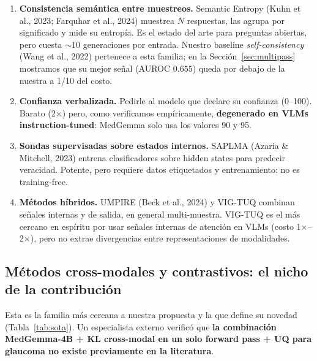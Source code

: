 \documentclass[12pt,a4paper]{article}
\begin{document}
\begin{enumerate}[leftmargin=1.6em]
    \item \textbf{Consistencia semántica entre muestreos.} Semantic
    Entropy (Kuhn et al., 2023; Farquhar et al., 2024) muestrea $N$
    respuestas, las agrupa por significado y mide su entropía. Es el
    estado del arte para preguntas abiertas, pero cuesta $\sim$10
    generaciones por entrada. Nuestro baseline \emph{self-consistency}
    (Wang et al., 2022) pertenece a esta familia; en la
    Sección~\ref{sec:multipass} mostramos que su mejor señal (AUROC
    $0.655$) queda por debajo de la nuestra a 1/10 del costo.
    \item \textbf{Confianza verbalizada.} Pedirle al modelo que declare su
    confianza (0--100). Barato (2$\times$) pero, como verificamos
    empíricamente, \textbf{degenerado en VLMs instruction-tuned}:
    MedGemma solo usa los valores 90 y 95.
    \item \textbf{Sondas supervisadas sobre estados internos.} SAPLMA
    (Azaria \& Mitchell, 2023) entrena clasificadores sobre hidden states
    para predecir veracidad. Potente, pero requiere datos etiquetados y
    entrenamiento: no es training-free.
    \item \textbf{Métodos híbridos.} UMPIRE (Beck et al., 2024) y VIG-TUQ
    combinan señales internas y de salida, en general multi-muestra.
    VIG-TUQ es el más cercano en espíritu por usar señales internas de
    atención en VLMs (costo 1$\times$--2$\times$), pero no extrae
    divergencias entre representaciones de modalidades.
\end{enumerate}

\subsection{Métodos cross-modales y contrastivos: el nicho de la contribución}

Esta es la familia más cercana a nuestra propuesta y la que define su
novedad (Tabla~\ref{tab:sota}). Un especialista externo verificó que
\textbf{la combinación MedGemma-4B + KL cross-modal en un solo forward
pass + UQ para glaucoma no existe previamente en la literatura}.
\end{document}
